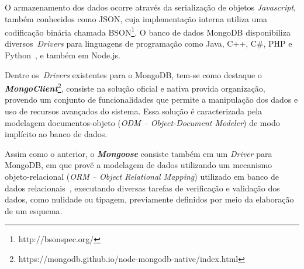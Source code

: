 \documentclass{svproc}
\begin{document}
O armazenamento dos dados ocorre através da serialização de objetos \textit{Javascript}, também conhecidos como JSON, cuja implementação interna utiliza uma codificação binária chamada BSON\footnote{http://bsonspec.org/}. O banco de dados MongoDB disponibiliza diversos~\emph{Drivers} para linguagens de programação como Java, C++, C\#, PHP e Python~\cite{lutu2015big}, e também em Node.js.

Dentre os~\emph{Drivers} existentes para o MongoDB, tem-se como destaque o \textbf{\textit{MongoClient}}\footnote{https://mongodb.github.io/node-mongodb-native/index.html}, consiste na solução oficial e nativa provida organização, provendo um conjunto de funcionalidades que permite a manipulação dos dados e uso de recursos avançados do sistema. Essa solução é caracterizada pela modelagem documentos-objeto (\emph{ODM -- Object-Document Modeler}) de modo implícito ao banco de dados.

Assim como o anterior, o \textbf{\textit{Mongoose}} consiste também em um \emph{Driver} para MongoDB, em que provê a modelagem de dados utilizando um mecanismo objeto-relacional (\emph{ORM -- Object Relational Mapping}) utilizado em banco de dados relacionais~\cite{mardan2014boosting}, executando diversas tarefas de verificação e validação dos dados, como nulidade ou tipagem, previamente definidos por meio da elaboração de um esquema.




\end{document}
